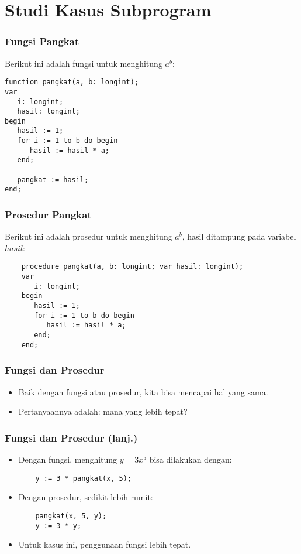 \documentclass{beamer}
\begin{document}
\section{Studi Kasus Subprogram}
\frame{\sectionpage}

\begin{frame}[fragile]
\frametitle{Fungsi Pangkat}
Berikut ini adalah fungsi untuk menghitung $a^b$:
\begin{lstlisting}
function pangkat(a, b: longint);
var
   i: longint;
   hasil: longint;
begin
   hasil := 1;
   for i := 1 to b do begin
      hasil := hasil * a;
   end;

   pangkat := hasil;
end;
\end{lstlisting}
\end{frame}

\begin{frame}[fragile]
\frametitle{Prosedur Pangkat}
Berikut ini adalah prosedur untuk menghitung $a^b$, hasil ditampung pada variabel $hasil$:
\begin{lstlisting}
    procedure pangkat(a, b: longint; var hasil: longint);
    var
       i: longint;
    begin
       hasil := 1;
       for i := 1 to b do begin
          hasil := hasil * a;
       end;
    end;
\end{lstlisting}
\end{frame}

\begin{frame}[fragile]
\frametitle{Fungsi dan Prosedur}
\begin{itemize}
    \item Baik dengan fungsi atau prosedur, kita bisa mencapai hal yang sama.
    \item Pertanyaannya adalah: \alert{mana yang lebih tepat}?
\end{itemize}
\end{frame}

\begin{frame}[fragile]
\frametitle{Fungsi dan Prosedur (lanj.)}
\begin{itemize}
    \item Dengan fungsi, menghitung $y = 3x^5$ bisa dilakukan dengan:
    \begin{lstlisting}
    y := 3 * pangkat(x, 5);
    \end{lstlisting}

    \item Dengan prosedur, sedikit lebih rumit:
    \begin{lstlisting}
    pangkat(x, 5, y);
    y := 3 * y;
    \end{lstlisting}

    \item Untuk kasus ini, \alert{penggunaan fungsi lebih tepat}.
\end{itemize}
\end{frame}
\end{document}
